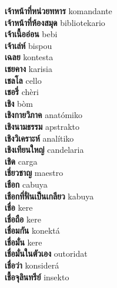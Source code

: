 \textbf{ เจ้าหน้าที่หน่วยทหาร  } komandante \\
\textbf{ เจ้าหน้าที่ห้องสมุด  } bibliotekario \\
\textbf{ เจ้าเนื้ออ่อน  } bebi \\
\textbf{ เจ้าเล่ห์  } bispou \\
\textbf{ เฉลย  } kontesta \\
\textbf{ เชยคาง  } karisia \\
\textbf{ เชลโล  } cello \\
\textbf{ เชอรี่  } chèri \\
\textbf{ เชิง  } bòm \\
\textbf{ เชิงกายวิภาค  } anatómiko \\
\textbf{ เชิงนามธรรม  } apstrakto \\
\textbf{ เชิงวิเคราะห์  } analítiko \\
\textbf{ เชิงเทียนใหญ่  } candelaria \\
\textbf{ เชิด  } carga \\
\textbf{ เชี่ยวชาญ  } maestro \\
\textbf{ เชือก  } cabuya \\
\textbf{ เชือกที่ฟั่นเป็นเกลียว  } kabuya \\
\textbf{ เชื่อ  } kere \\
\textbf{ เชื่อถือ  } kere \\
\textbf{ เชื่อมกัน  } konektá \\
\textbf{ เชื่อมั่น  } kere \\
\textbf{ เชื่อมั่นในตัวเอง  } outoridat \\
\textbf{ เชื่อว่า  } konsiderá \\
\textbf{ เชื้อจุลินทรีย์  } insekto \\
